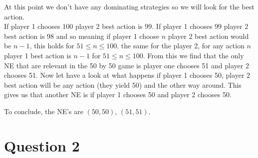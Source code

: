 \documentclass{article}
\begin{document}



At this point we don't have any dominating strategies so we will look for the
best action.\\
If player 1 chooses 100 player 2 best action is 99. If player 1 chooses 99
player 2 best action is 98 and so meaning if player 1 choose $n$ player 2 best
action would be $n-1$, this holds for $ 51 \leq n \leq 100$. the same for the
player 2, for any action $n$ player 1 best action is $n-1$ for $ 51 \leq n \leq
100$. From this we find that the only NE that are relevant in the 50 by 50 game
is player one chooses 51 and player 2 chooses 51. Now let have a look at what
happens if player 1 chooses 50, player 2 best action will be any action (they
yield 50) and the other way around. This gives us that another NE is if player 1
chooses 50 and player 2 chooses 50.

To conclude, the NE's are $(50,50)$, $(51,51)$.


\section*{Question 2}
\end{document}
